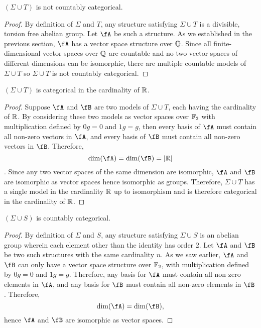 \begin{claim}
  $(\Sigma \cup T)$ is not countably categorical.

  \begin{proof}
    By definition of $\Sigma$ and $T$, any structure satisfying $\Sigma \cup T$
    is a divisible, torsion free abelian group.
    Let $\fA$ be such a structure.
    As we established in the previous section, $\fA$ has a vector space structure over $\mathbb{Q}$.
    Since all finite-dimensional vector spaces over $\mathbb{Q}$ are countable and
    no two vector spaces of different dimensions can be isomorphic,
    there are multiple countable models of $\Sigma \cup T$
    so $\Sigma \cup T$ is not countably categorical.
  \end{proof}
\end{claim}
\begin{claim}
  $(\Sigma \cup T)$ is categorical in the cardinality of $\mathbb{R}$.

  \begin{proof}
    Suppose $\fA$ and $\fB$ are two models of $\Sigma \cup T$,
    each having the cardinality of $\mathbb{R}$.
    By considering these two models as vector spaces over $\mathbb{F}_2$
    with multiplication defined by $0g = 0$ and $1g = g$,
    then every basis of $\fA$ must contain all non-zero vectors in $\fA$,
    and every basis of $\fB$ must contain all non-zero vectors in $\fB$.
    Therefore, \[ \dim(\fA) = \dim(\fB) = \abs{\R} \].
    Since any two vector spaces of the same dimension are isomorphic,
    $\fA$ and $\fB$ are isomorphic as vector spaces hence isomorphic as groups.
    Therefore, $\Sigma \cup T$ has a single model in the cardinality $\mathbb{R}$
    up to isomorphism and is therefore categorical in the cardinality of $\mathbb{R}$.
  \end{proof}
\end{claim}

\begin{claim}
  $(\Sigma \cup S)$ is countably categorical.

  \begin{proof}
    By definition of $\Sigma$ and $S$, any structure satisfying $\Sigma \cup S$
    is an abelian group wherein each element other than the identity has order $2$.
    Let $\fA$ and $\fB$ be two such structures with the same cardinality $n$.
    As we saw earlier, $\fA$ and $\fB$ can only have a vector space structure over $\mathbb{F}_2$,
    with multiplication defined by $0g = 0$ and $1g = g$.
    Therefore, any basis for $\fA$ must contain all non-zero elements in $\fA$,
    and any basis for $\fB$ must contain all non-zero elements in $\fB$.
    Therefore, \[ \dim(\fA) = \dim(\fB), \]
    hence $\fA$ and $\fB$ are isomorphic as vector spaces.
  \end{proof}
\end{claim}




